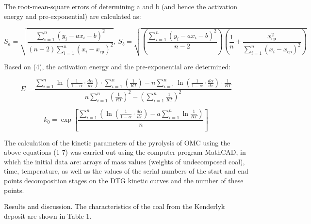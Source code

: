 The root-mean-square errors of determining a and b (and hence the
activation energy and pre-exponential) are calculated as:

\begin{equation}
S_{a} = \sqrt{\frac{\sum_{i=1}^{n} \left( y_{i} - ax_{i} - b \right)^{2}}{\left( n - 2 \right) \sum_{i=1}^{n} \left( x_{i} - x_{\text{ср}} \right)^{2}}},\
S_{b} = \sqrt{ \left( \frac{\sum_{i=1}^{n} \left( y_{i} - ax_{i} - b \right)^{2}}{n - 2} \right) \left( \frac{1}{n} + \frac{x_{\text{ср}}^{2}}{\sum_{i=1}^{n} \left( x_{i} - x_{\text{ср}} \right)^{2}} \right) }
\end{equation}


Based on (4), the activation energy and the pre-exponential are
determined:

\begin{equation}
E = \frac{\sum_{i=1}^{n} \ln \left( \frac{1}{1 - \alpha} \cdot \frac{d\alpha}{d\tau} \right) \cdot \sum_{i=1}^{n} \left( \frac{1}{RT} \right) - n \sum_{i=1}^{n} \ln \left( \frac{1}{1 - \alpha} \cdot \frac{d\alpha}{d\tau} \right) \cdot \frac{1}{RT} }{n \sum_{i=1}^{n} \left( \frac{1}{RT} \right)^{2} - \left( \sum_{i=1}^{n} \frac{1}{RT} \right)^{2}}
\end{equation}

\begin{equation}
k_{0} = \exp \left[ \frac{\sum_{i=1}^{n} \left( \ln \left( \frac{1}{1 - \alpha} \cdot \frac{d\alpha}{d\tau} \right) - a \sum_{i=1}^{n} \ln \frac{1}{RT} \right)}{n} \right]
\end{equation}

\begin{multicols}{2}
The calculation of the kinetic parameters of the pyrolysis of OMC using
the above equations (1-7) was carried out using the computer program
MathCAD, in which the initial data are: arrays of mass values (weights
of undecomposed coal), time, temperature, as well as the values of the
serial numbers of the start and end points decomposition stages on the
DTG kinetic curves and the number of these points.

Results and discussion. The characteristics of the coal from the
Kenderlyk deposit are shown in Table 1.
\end{multicols}

